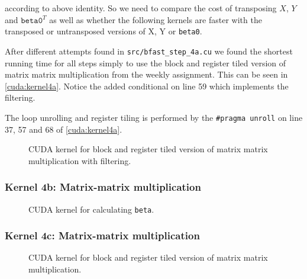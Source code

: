 according to above identity. So we need to compare the cost of transposing
\(X\), \(Y\) and \(\texttt{beta0}^T\) as well as whether the following kernels
are faster with the transposed or untransposed versions of X, Y or
\texttt{beta0}. 

After different attempts found in \texttt{src/bfast\_step\_4a.cu} we found the
shortest running time for all steps simply to use the block and register tiled
version of matrix matrix multiplication from the weekly assignment. This can be
seen in \autoref{cuda:kernel4a}. Notice the added conditional on line 59 which
implements the filtering.

The loop unrolling and register tiling is performed by the \texttt{\#pragma
unroll} on line 37, 57 and 68 of \autoref{cuda:kernel4a}.


\begin{figure}[H]
    \centering
    \caption{CUDA kernel for block and register tiled version of matrix matrix
    multiplication with filtering.}
    \label{cuda:kernel4a}
\end{figure}


\subsubsection{Kernel 4b:  Matrix-matrix multiplication}

\begin{figure}[H]
    \centering
    \caption{CUDA kernel for calculating \texttt{beta}.}
    \label{cuda:kernel4b}
\end{figure}


\subsubsection{Kernel 4c:  Matrix-matrix multiplication}

\begin{figure}[H]
    \centering
    \caption{CUDA kernel for block and register tiled version of matrix matrix multiplication.}
    \label{cuda:kernel4c}
\end{figure}



